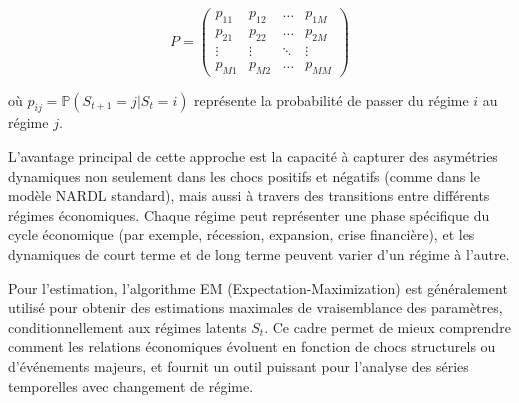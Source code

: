 \[
P = \begin{pmatrix}
    p_{11} & p_{12} & \dots & p_{1M} \\
    p_{21} & p_{22} & \dots & p_{2M} \\
    \vdots & \vdots & \ddots & \vdots \\
    p_{M1} & p_{M2} & \dots & p_{MM}
\end{pmatrix}
\]

où \( p_{ij} = \mathbb{P}(S_{t+1} = j | S_t = i) \) représente la probabilité de passer du régime \( i \) au régime \( j \).

L'avantage principal de cette approche est la capacité à capturer des asymétries dynamiques non seulement dans les chocs positifs et négatifs (comme dans le modèle NARDL standard), mais aussi à travers des transitions entre différents régimes économiques. Chaque régime peut représenter une phase spécifique du cycle économique (par exemple, récession, expansion, crise financière), et les dynamiques de court terme et de long terme peuvent varier d'un régime à l'autre.

Pour l'estimation, l'algorithme EM (Expectation-Maximization) est généralement utilisé pour obtenir des estimations maximales de vraisemblance des paramètres, conditionnellement aux régimes latents \( S_t \). Ce cadre permet de mieux comprendre comment les relations économiques évoluent en fonction de chocs structurels ou d'événements majeurs, et fournit un outil puissant pour l'analyse des séries temporelles avec changement de régime.
